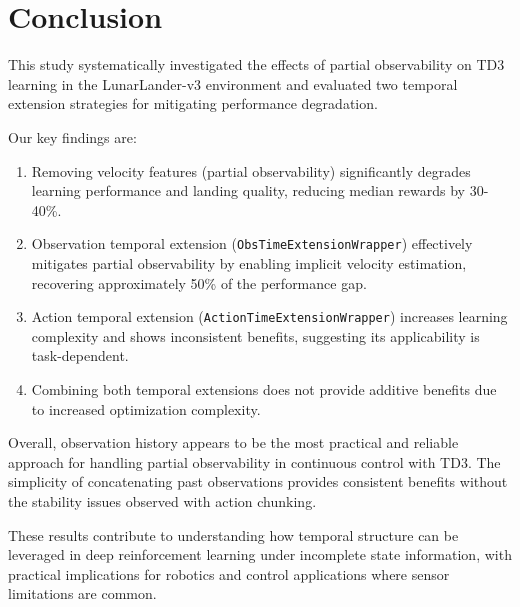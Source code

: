 \documentclass[12pt, a4paper]{article}
\begin{document}
\section{Conclusion}

This study systematically investigated the effects of partial observability on TD3 learning in the LunarLander-v3 environment and evaluated two temporal extension strategies for mitigating performance degradation.

Our key findings are:
\begin{enumerate}
	\item Removing velocity features (partial observability) significantly degrades learning performance and landing quality, reducing median rewards by 30-40\%.
	
	\item Observation temporal extension (\texttt{ObsTimeExtensionWrapper}) effectively mitigates partial observability by enabling implicit velocity estimation, recovering approximately 50\% of the performance gap.
	
	\item Action temporal extension (\texttt{ActionTimeExtensionWrapper}) increases learning complexity and shows inconsistent benefits, suggesting its applicability is task-dependent.
	
	\item Combining both temporal extensions does not provide additive benefits due to increased optimization complexity.
\end{enumerate}

Overall, observation history appears to be the most practical and reliable approach for handling partial observability in continuous control with TD3. The simplicity of concatenating past observations provides consistent benefits without the stability issues observed with action chunking.

These results contribute to understanding how temporal structure can be leveraged in deep reinforcement learning under incomplete state information, with practical implications for robotics and control applications where sensor limitations are common.
\end{document}
